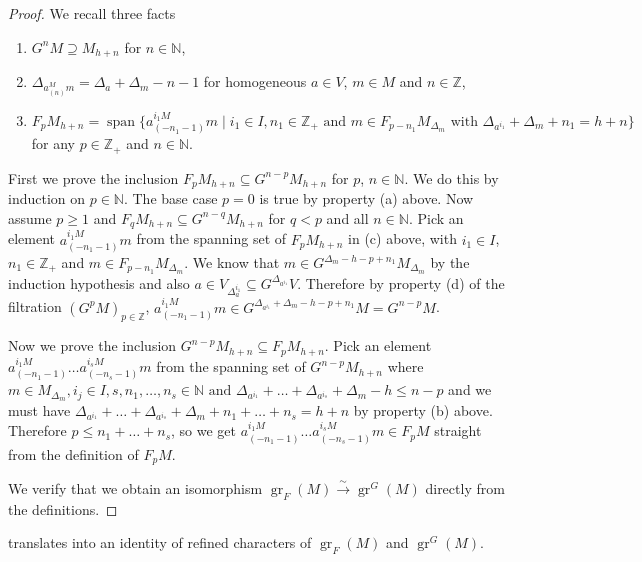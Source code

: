 \documentclass[12pt, a4paper]{article}
\DeclareMathOperator{\gr}{gr}
\DeclareMathOperator{\vspan}{span}
\begin{document}
\begin{proof}
  We recall three facts
  \begin{enumerate}[label={(\alph*)}]
  \item $G^nM \supseteq M_{h + n}$ for $n \in \mathbb{N}$,
  \item $\Delta_{a^M_{(n)}m} = \Delta_a + \Delta_m - n - 1$ for homogeneous $a \in V$, $m \in M$ and $n \in \mathbb{Z}$,
  \item $F_pM_{h + n} = \vspan\{a^{i_1M}_{(-n_1 - 1)}m \mid i_1 \in I, n_1 \in \mathbb{Z}_+\text{ and } m \in F_{p - n_1}M_{\Delta_m}\text{ with }\Delta_{a^{i_1}} + \Delta_m + n_1 = h + n\}$ for any $p \in \mathbb{Z}_+$ and $n \in \mathbb{N}$.
  \end{enumerate}
  First we prove the inclusion $F_pM_{h + n} \subseteq G^{n - p}M_{h + n}$ for $p$, $n \in \mathbb{N}$.
  We do this by induction on $p \in \mathbb{N}$.
  The base case $p = 0$ is true by property (a) above.
  Now assume $p \ge 1$ and $F_qM_{h + n} \subseteq G^{n - q}M_{h + n}$ for $q < p$ and all $n \in \mathbb{N}$.
  Pick an element $a^{i_1M}_{(-n_1 - 1)}m$ from the spanning set of $F_pM_{h + n}$ in (c) above, with $i_1 \in I$, $n_1 \in \mathbb{Z}_+$ and $m \in F_{p - n_1}M_{\Delta_m}$.
  We know that $m \in G^{\Delta_m - h - p + n_1}M_{\Delta_m}$ by the induction hypothesis and also $a \in V_{\Delta_a^{i_1}} \subseteq G^{\Delta_{a^{i_1}}}V$.
  Therefore by property (d) of the filtration $(G^pM)_{p \in \mathbb{Z}}$, $a^{i_1M}_{(-n_1 - 1)}m \in G^{\Delta_{a^{i_1}} + \Delta_m - h - p + n_1}M = G^{n - p}M$.

  Now we prove the inclusion $G^{n - p}M_{h + n} \subseteq F_pM_{h + n}$.
  Pick an element $a^{i_1M}_{(-n_1 - 1)}\dots a^{i_sM}_{(-n_s - 1)}m$ from the spanning set of $G^{n - p}M_{h + n}$ where $m \in M_{\Delta_m}, i_j \in I, s, n_1, \dots, n_s\in \mathbb{N}\text{ and }\Delta_{a^{i_1}} + \dots + \Delta_{a^{i_s}} + \Delta_m - h \le n - p$ and we must have $\Delta_{a^{i_1}} + \dots + \Delta_{a^{i_s}} + \Delta_m + n_1 + \dots + n_s = h + n$ by property (b) above.
  Therefore $p \le n_1 + \dots + n_s$, so we get $a^{i_1M}_{(-n_1 - 1)}\dots a^{i_sM}_{(-n_s - 1)}m \in F_pM$ straight from the definition of $F_pM$.

  We verify that we obtain an isomorphism $\gr_F(M) \xrightarrow{\sim} \gr^G(M)$ directly from the definitions.
\end{proof}

 translates into an identity of refined characters of $\gr_F(M)$ and $\gr^G(M)$.
\end{document}
